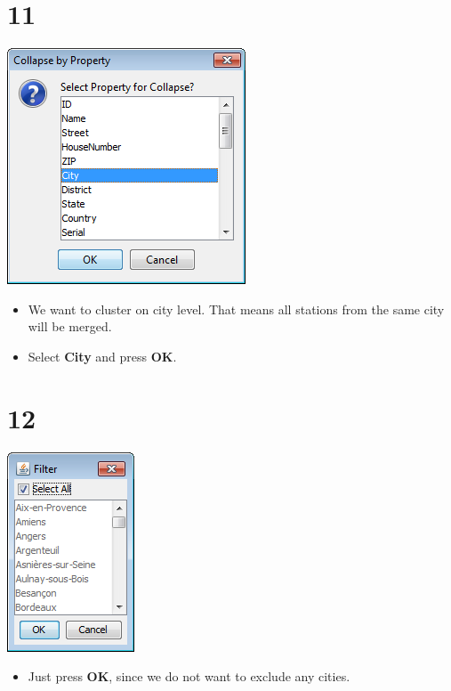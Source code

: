 \documentclass{beamer}
\begin{document}
\section{11}
\begin{frame}
	\begin{center}
  		\includegraphics[height=0.5\textheight]{11.png}
	\end{center}
	\begin{itemize}
		\item We want to cluster on city level. That means all stations from the same city will be merged.
		\item Select \textbf{City} and press \textbf{OK}.
	\end{itemize}
\end{frame}

\section{12}
\begin{frame}
	\begin{center}
  		\includegraphics[height=0.5\textheight]{12.png}
	\end{center}
	\begin{itemize}
		\item Just press \textbf{OK}, since we do not want to exclude any cities.
	\end{itemize}
\end{frame}
\end{document}
